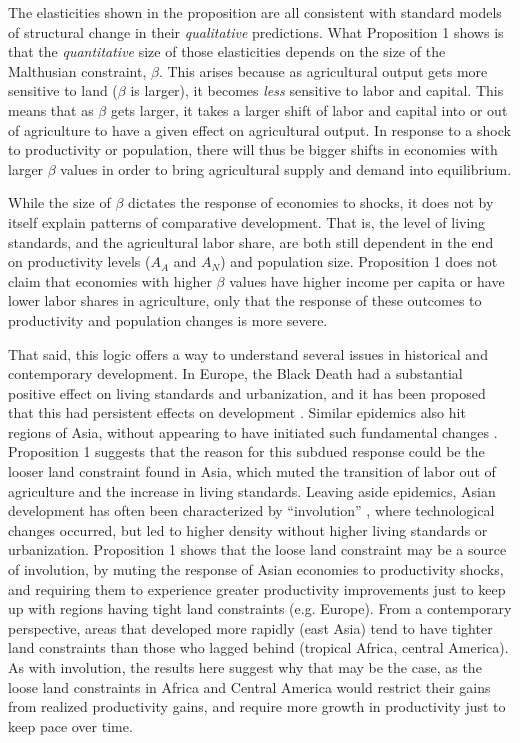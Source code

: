 \documentclass[11pt]{article}
\begin{document}
\vspace{.3cm} The elasticities shown in the proposition are all consistent with standard models of structural change \citep{kp2001,Gollin:2007oq,Restuccia:2008hc,Gollin:2010ys,vollrath2011,Alvarez-Cuadrado:2011nx,hrv2014,duarte2010role} in their \textit{qualitative} predictions. What Proposition 1 shows is that the \textit{quantitative} size of those elasticities depends on the size of the Malthusian constraint, $\beta$. This arises because as agricultural output gets more sensitive to land ($\beta$ is larger), it becomes \textit{less} sensitive to labor and capital. This means that as $\beta$ gets larger, it takes a larger shift of labor and capital into or out of agriculture to have  a given effect on agricultural output. In response to a shock to productivity or population, there will thus be bigger shifts in economies with larger $\beta$ values in order to bring agricultural supply and demand into equilibrium.

While the size of $\beta$ dictates the response of economies to shocks, it does not by itself explain patterns of comparative development. That is, the level of living standards, and the agricultural labor share, are both still dependent in the end on productivity levels ($A_A$ and $A_N$) and population size. Proposition 1 does not claim that economies with higher $\beta$ values have higher income per capita or have lower labor shares in agriculture, only that the response of these outcomes to productivity and population changes is more severe.

That said, this logic offers a way to understand several issues in historical and contemporary development. In Europe, the Black Death had a substantial positive effect on living standards and urbanization, and it has been proposed that this had persistent effects on development \citep{vv08,vv13}. Similar epidemics also hit regions of Asia, without appearing to have initiated such fundamental changes \citep{McNeill1976}. Proposition 1 suggests that the reason for this subdued response could be the looser land constraint found in Asia, which muted the transition of labor out of agriculture and the increase in living standards. Leaving aside epidemics, Asian development has often been characterized by ``involution'' \citep{Geertz1963,Huang1990,huang2002}, where technological changes occurred, but led to higher density without higher living standards or urbanization. Proposition 1 shows that the loose land constraint may be a source of involution, by muting the response of Asian economies to productivity shocks, and requiring them to experience greater productivity improvements just to keep up with regions having tight land constraints (e.g. Europe). From a contemporary perspective, areas that developed more rapidly (east Asia) tend to have tighter land constraints than those who lagged behind (tropical Africa, central America). As with involution, the results here suggest why that may be the case, as the loose land constraints in Africa and Central America would restrict their gains from realized productivity gains, and require more growth in productivity just to keep pace over time. 
\end{document}

